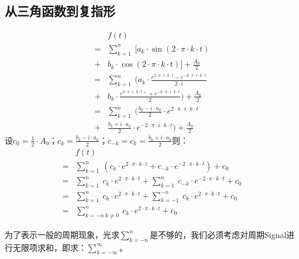 \subsection{从三角函数到复指形}
\begin{align*}
	  & f(t)                                                                                                                      \\
	= & \sum\limits_{k=1}^n\ [a_k\cdot \sin(2\cdot\pi\cdot k\cdot t)                                                              \\
	+ & b_k\cdot \cos(2\cdot \pi\cdot k\cdot t)]+\frac{A_0}{2}                                                                    \\
	= & \sum\limits_{k=1}^n\ (a_k\cdot \frac{e^{2\cdot \pi\cdot i\cdot k\cdot t}- e^{-2\cdot \pi\cdot i\cdot k\cdot t}}{2\cdot i} \\
	+ & b_k\cdot \frac{e^{2\cdot \pi\cdot i\cdot k\cdot t+}+e^{-2\cdot \pi\cdot i\cdot k\cdot t}}{2})+\frac{A_0}{2}               \\
	= & \sum\limits_{k=1}^n\ (\frac{b_k-i\cdot a_k}{2}\cdot e^{2\cdot \pi\cdot i\cdot k\cdot t}                                   \\
	+ & \frac{b_k+i\cdot a_k}{2}\cdot e^{-2\cdot \pi\cdot i\cdot k\cdot t})+\frac{A_0}{2}
\end{align*}
设$c_0=\frac{1}{2}\cdot A_0$；$c_k=\frac{b_k-i\cdot a_k}{2}$；$c_{-k}=\overline{c_{k}}=\frac{b_k+i\cdot a_k}{2}$则：
\begin{align*}
	  & f(t)                                                                                                                          \\
	= & \sum\limits_{k=1}^n\ (c_k\cdot e^{2\cdot \pi\cdot k\cdot t}+c_{-k}\cdot e^{-2\cdot \pi\cdot k\cdot t})+c_0                    \\
	= & \sum\limits_{k=1}^n\ c_k\cdot e^{2\cdot \pi\cdot k\cdot t}+\sum\limits_{k=1}^n\ c_{-k}\cdot e^{-2\cdot \pi\cdot k\cdot t}+c_0 \\
	= & \sum\limits_{k=1}^n\ c_k\cdot e^{2\cdot \pi\cdot k\cdot t}+\sum\limits_{k=-1}^{-n}\ c_k\cdot e^{2\cdot \pi\cdot k\cdot t}+c_0 \\
	= & \sum\limits_{k=-n\ k\neq0}^n\ c_k\cdot e^{2\cdot \pi\cdot k\cdot t}+c_0
\end{align*}

为了表示一般的周期现象，光求$\sum\limits_{k=-n}^n$是不够的，我们必须考虑对周期Signal进行无限项求和，即求：$\sum\limits_{k=-\infty}^\infty$。

